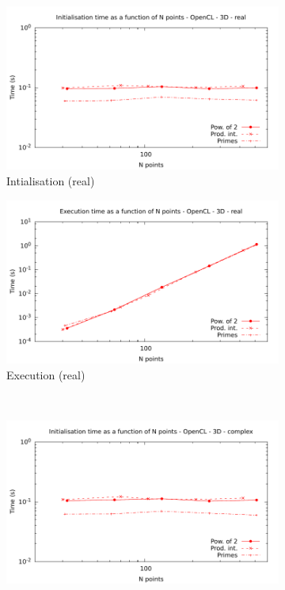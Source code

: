 \documentclass[12pt, a4paper]{article}
\begin{document}
\begin{figure}[H]
\captionsetup{width=0.8\linewidth}
\centering
\begin{subfigure}{.5\textwidth}
\centering
\includegraphics[width=.9\linewidth]{graphs/fft-opencl-3d-pow2-r-init.pdf}
\caption{Intialisation (real)}
\label{FFTCL3DRI}
\end{subfigure}%
\begin{subfigure}{.5\textwidth}
\centering
\includegraphics[width=.9\linewidth]{graphs/fft-opencl-3d-pow2-r-exec.pdf}
\caption{Execution (real)}
\label{FFTCL3DRE}
\end{subfigure}\\
\begin{subfigure}{.5\textwidth}
\centering
\includegraphics[width=.9\linewidth]{graphs/fft-opencl-3d-pow2-c-init.pdf}

\end{subfigure}
\end{figure}
\end{document}
